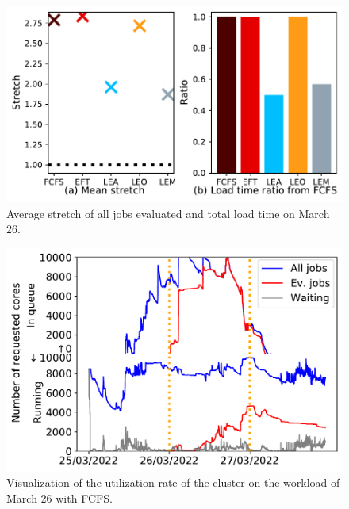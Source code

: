 \documentclass[sigconf,review,anonymous]{acmart}
\begin{document}
\begin{figure}[t]\centering\includegraphics[width=0.9\linewidth]{../MBSS/plot/Results_FCFS_Score_Backfill_2022-03-26->2022-03-26_V10000_Mean_Stretch_Total_waiting_for_a_load_time_and_transfer_time_450_128_32_256_4_1024.pdf}\caption{Average stretch of all jobs evaluated and total load time on March 26.}\label{stretch.03-26}\end{figure}
\begin{figure}[t]\centering\includegraphics[width=0.9\linewidth]{../MBSS/plot/Cluster_usage/2022-03-26->2022-03-26_V10000_Fcfs_Used_nodes_Reduced_450_128_32_256_4_1024_core_by_core.pdf}\caption{Visualization of the utilization rate of the cluster on the workload of March 26 with FCFS.}\label{cluster_usage.03-26_fcfs}\end{figure}
\end{document}
